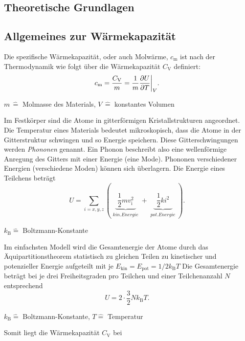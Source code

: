 \subsection{Theoretische Grundlagen}
\subsection{Allgemeines zur Wärmekapazität}
Die spezifische Wärmekapazität, oder auch Molwärme, $c_{\text{m}}$ ist nach der Thermodynamik wie folgt über die Wärmekapazität $C_{\text{V}}$ definiert:
\begin{equation*}
	c_{\text{m}} = \frac{C_{\text{V}}}{m} = \frac{1}{m} \frac{\partial U}{\partial T} \bigg{\vert}_{V}.
\end{equation*}
\begin{center}
	\tiny{$m \, \widehat{=}$ Molmasse des Materials, $V \, \widehat{=}$ konstantes Volumen }
\end{center}
Im Festkörper sind die Atome in gitterförmigen Kristallstrukturen angeordnet.
Die Temperatur eines Materials bedeutet mikroskopisch, dass die Atome in der Gitterstruktur schwingen und so Energie speichern.
Diese Gitterschwingungen werden \textit{Phononen} genannt.
Ein Phonon beschreibt also eine wellenförmige Anregung des Gitters mit einer Energie (eine Mode).
Phononen verschiedener Energien (verschiedene Moden) können sich überlagern.
Die Energie eines Teilchens beträgt
\begin{equation*}
	U = \sum_{i=x,y,z} \left( \underbrace{ \,\, \frac{1}{2}mv_{\text{i}}^2 \,\, }_{\substack{kin. Energie}} + \underbrace{ \,\, \frac{1}{2} k i^2 \,\, }_{\substack{pot. Energie}} \right).
\end{equation*}
\begin{center}
	\tiny{$k_{\text{B}} \widehat{=}$ Boltzmann-Konstante }
\end{center}
Im einfachsten Modell wird die Gesamtenergie der Atome durch das Äquipartitionstheorem statistisch zu gleichen Teilen zu kinetischer und potenzieller Energie aufgeteilt mit je $E_{\text{kin}} = E_{\text{pot}} = 1/2 k_{\text{B}} T $
Die Gesamtenergie beträgt bei je drei Freiheitsgraden pro Teilchen und einer Teilchenanzahl $N$ entsprechend
\begin{equation*}
	U = 2 \cdot \frac{3}{2} N k_{\text{B}} T.
\end{equation*}
\begin{center}
	\tiny{$k_{\text{B}} \widehat{=}$ Boltzmann-Konstante, $T \widehat{=}$ Temperatur}
\end{center}
Somit liegt die Wärmekapazität $C_{\text{V}}$ bei
